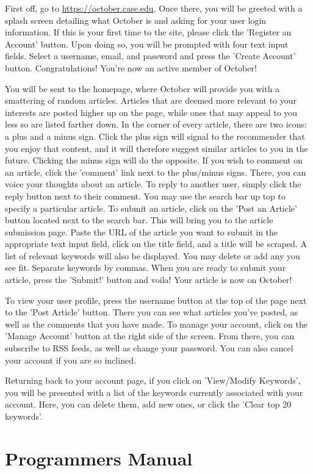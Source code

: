 \documentclass[11pt,letterpaper]{article}
\begin{document}
First off, go to \url{https://october.case.edu}.
Once there, you will be greeted with a splash screen detailing what October is and asking for your user login information. If this is your first time to the site, please click the 'Register an Account' button.
Upon doing so, you will be prompted with four text input fields. Select a username, email, and password and press the 'Create Account' button.
Congratulations! You're now an active member of October!

You will be sent to the homepage, where October will provide you with a smattering of random articles.
Articles that are deemed more relevant to your interests are posted higher up on the page, while ones that may appeal to you less so are listed farther down.
In the corner of every article, there are two icons: a plus and a minus sign.
Click the plus sign will signal to the recommender that you enjoy that content, and it will therefore suggest similar articles to you in the future. Clicking the minus sign will do the opposite.
If you wish to comment on an article, click the 'comment' link next to the plus/minus signs.
There, you can voice your thoughts about an article.
To reply to another user, simply click the reply button next to their comment.
You may use the search bar up top to specify a particular article.
To submit an article, click on the 'Post an Article' button located next to the search bar.
This will bring you to the article submission page.
Paste the URL of the article you want to submit in the appropriate text input field, click on the title field, and a title will be scraped.
A list of relevant keywords will also be displayed.
You may delete or add any you see fit.
Separate keywords by commas.
When you are ready to submit your article, press the 'Submit!' button and voila!
Your article is now on October!

To view your user profile, press the username button at the top of the page next to the 'Post Article' button.
There you can see what articles you've posted, as well as the comments that you have made.
To manage your account, click on the 'Manage Account' button at the right side of the screen.
From there, you can  subscribe to RSS feeds, as well as change your password.
You can also cancel your account if you are so inclined.

Returning back to your account page, if you click on 'View/Modify Keywords', you will be presented with a list of the keywords currently associated with your account. Here, you can delete them, add new ones, or click the 'Clear top 20 keywords'.

\section{Programmers Manual}
\end{document}
